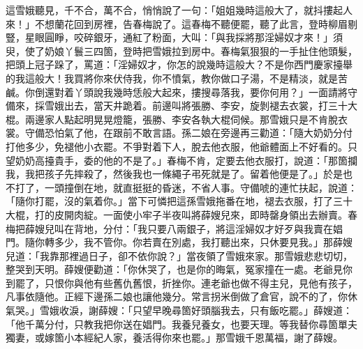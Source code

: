 這雪娥聽見，千不合，萬不合，悄悄說了一句：「姐姐幾時這般大了，就抖摟起人來！」{}不想蘭花回到房裡，告春梅說了。這春梅不聽便罷，聽了此言，登時柳眉剔豎，星眼圓睜，咬碎銀牙，通紅了粉面，大叫：「與我採將那淫婦奴才來！」須臾，使了奶娘丫鬟三四箇，登時把雪娥拉到房中。春梅氣狠狠的一手扯住他頭髮，把頭上冠子跺了，罵道：「淫婦奴才，你怎的說幾時這般大？不是你西門慶家擡舉的我這般大！我買將你來伏侍我，你不憤氣，教你做口子湯，不是精淡，就是苦鹹。你倒還對着丫頭說我幾時恁般大起來，摟搜尋落我，要你何用？」一面請將守備來，採雪娥出去，當天井跪着。前邊叫將張勝、李安，旋剝褪去衣裳，打三十大棍。兩邊家人點起明晃晃燈籠，張勝、李安各執大棍伺候。那雪娥只是不肯脫衣裳。守備恐怕氣了他，在跟前不敢言語。孫二娘在旁邊再三勸道：「隨大奶奶分付打他多少，免褪他小衣罷。不爭對着下人，脫去他衣服，他爺體面上不好看的。只望奶奶高擡貴手，委的他的不是了。」春梅不肯，定要去他衣服打，說道：「那箇攔我，我把孩子先摔殺了，然後我也一條繩子弔死就是了。留着他便是了。」{}於是也不打了，一頭撞倒在地，就直挺挺的昏迷，不省人事。守備唬的連忙扶起，說道：「隨你打罷，沒的氣着你。」當下可憐把這孫雪娥拖番在地，褪去衣服，打了三十大棍，打的皮開肉綻。一面使小牢子半夜叫將薛嫂兒來，即時罄身領出去辦賣。春梅把薛嫂兒叫在背地，分付：「我只要八兩銀子，將這淫婦奴才好歹與我賣在娼門。隨你轉多少，我不管你。你若賣在別處，我打聽出來，只休要見我。」那薛嫂兒道：「我靠那裡過日子，卻不依你說？」當夜領了雪娥來家。那雪娥悲悲切切，整哭到天明。薛嫂便勸道：「你休哭了，也是你的晦氣，冤家撞在一處。{}老爺見你到罷了，只恨你與他有些舊仇舊恨，折挫你。連老爺也做不得主兒，見他有孩子，凡事依隨他。正經下邊孫二娘也讓他幾分。常言拐米倒做了倉官，說不的了，你休氣哭。」雪娥收淚，謝薛嫂：「只望早晚尋箇好頭腦我去，只有飯吃罷。」薛嫂道：「他千萬分付，只教我把你送在娼門。我養兒養女，也要天理。等我替你尋箇單夫獨妻，或嫁箇小本經紀人家，養活得你來也罷。」那雪娥千恩萬福，謝了薛嫂。

